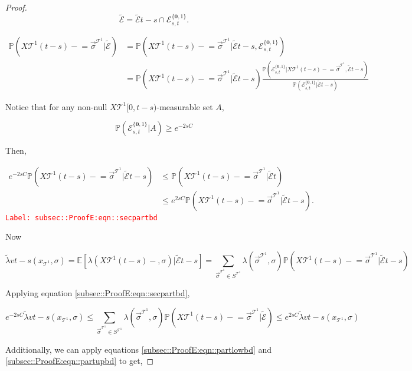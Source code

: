 \documentclass[12pt]{article}
\newcommand{\mb}{\mathbb}
\newcommand{\mc}{\mathcal}
\newcommand{\tr}{\textcolor{red}}
\newcommand{\labe}[1]{\tr{\texttt{Label: #1}}}
\newcommand{\pr}{\mb{P}}							%
\newcommand{\ex}[1]{\mb{E}\left[#1\right]}			%
\renewcommand{\root}{\mathbf{0}}				%
\renewcommand{\v}{v}							%
\renewcommand{\S}{S}							%
\newcommand{\s}{\sigma}							%
\newcommand{\sv}{\vec{\s}}						%
\newcommand{\x}{x}								%
\renewcommand{\t}{t}							%
\renewcommand{\tt}{s}							%
\newcommand{\X}{X}								%
\newcommand{\carp}[1]{^{#1}}					%
\newcommand{\vsi}[1]{^{#1}}						%
\newcommand{\cind}[1]{_{#1}}					%
\newcommand{\tip}[1]{#1}						%
\newcommand{\const}{C}							%
\newcommand{\tree}{\mc{T}}						%
\newcommand{\sln}[1]{^{#1}}						%
\newcommand{\rate}{\lambda}						%
\newcommand{\alt}[1]{\widetilde{#1}}			%
\newcommand{\evnt}{\mc{E}}						%
\newcommand{\typset}{A}							%
\newcommand{\crate}{\alt{\lambda}}				%
\begin{document}
\begin{proof}
\[\alt{\evnt}{	} = \alt{\evnt}{\t-\tt}\cap \evnt{}^{\{\root,1\}}_{\tt,\t}.\]

\begin{align*}
\pr\left(\X{\tree\sln{1}}{(\t-\tt)-}=\sv\cind{}\vsi{\tree\sln{1}}|\alt{\evnt}{	}\right) &= \pr\left(\X{\tree\sln{1}}{(\t-\tt)-}=\sv\cind{}\vsi{\tree\sln{1}}|\alt{\evnt}{\t-\tt},\evnt{}^{\{\root,1\}}_{\tt,\t}\right)\\
&=\pr\left(\X{\tree\sln{1}}{(\t-\tt)-}=\sv\cind{}\vsi{\tree\sln{1}}|\alt{\evnt}{\t-\tt}\right)\frac{\pr\left(\evnt{}^{\{\root,1\}}_{\tt,\t}|\X{\tree\sln{1}}{(\t-\tt)-}=\sv\cind{}\vsi{\tree\sln{1}},\alt{\evnt}{\t-\tt}\right)}{\pr\left(\evnt{}^{\{\root,1\}}_{\tt,\t}|\alt{\evnt}{\t-\tt}\right)}
\end{align*}

Notice that for any non-null \(\X{\tree\sln{1}}{[0,\t-\tt)}\)-measurable set \(\typset\), 

\[\pr(\evnt{}^{\{\root,1\}}_{\tt,\t}|\typset) \geq e^{-2\tt\const{}}\]

Then,

\begin{align}
e^{-2\tt\const{}}\pr\left(\X{\tree\sln{1}}{(\t-\tt)-}=\sv\cind{}\vsi{\tree\sln{1}}|\alt{\evnt}{\t-\tt}\right) &\leq \pr\left(\X{\tree\sln{1}}{(\t-\tt)-}=\sv\cind{}\vsi{\tree\sln{1}}|\alt{\evnt}{\t}\right)\nonumber\\
&\leq e^{2\tt\const{}}\pr\left(\X{\tree\sln{1}}{(\t-\tt)-}=\sv\cind{}\vsi{\tree\sln{1}}|\alt{\evnt}{\t-\tt}\right).
\label{subsec::ProofE:eqn::secpartbd}
\end{align}
\labe{subsec::ProofE:eqn::secpartbd}

Now

\[\crate{\v}{\t-\tt}(\x\cind{\tree\sln{1}}\tip{},\s) = \ex{\rate{}(\X{\tree\sln{1}}{(\t-\tt)-},\s)|\alt{\evnt}{\t-\tt}} = \sum_{\sv\cind{}\vsi{\tree\sln{1}}\in \S\carp{\tree\sln{1}}}\rate{}(\sv\cind{}\vsi{\tree\sln{1}},\s)\pr\left(\X{\tree\sln{1}}{(\t-\tt)-} = \sv\cind{}\vsi{\tree\sln{1}}|\alt{\evnt}{\t-\tt}\right)\]

Applying equation \eqref{subsec::ProofE:eqn::secpartbd},

\[e^{-2\tt\const{}}\crate{\v}{\t-\tt}(\x\cind{\tree\sln{1}}\tip{},\s) \leq \sum_{\sv\cind{}\vsi{\tree\sln{1}}\in \S\carp{\tree\sln{1}}} \lambda(\sv\cind{}\vsi{\tree\sln{1}},\s)\pr(\X{\tree\sln{1}}{(\t-\tt)-} = \sv\cind{}\vsi{\tree\sln{1}}|\alt{\evnt}{	})\leq e^{2\tt\const{}}\crate{\v}{\t-\tt}(\x\cind{\tree\sln{1}}\tip{},\s)\]

Additionally, we can apply equations \eqref{subsec::ProofE:eqn::partlowbd} and  \eqref{subsec::ProofE:eqn::partupbd} to get,


\end{proof}
\end{document}
